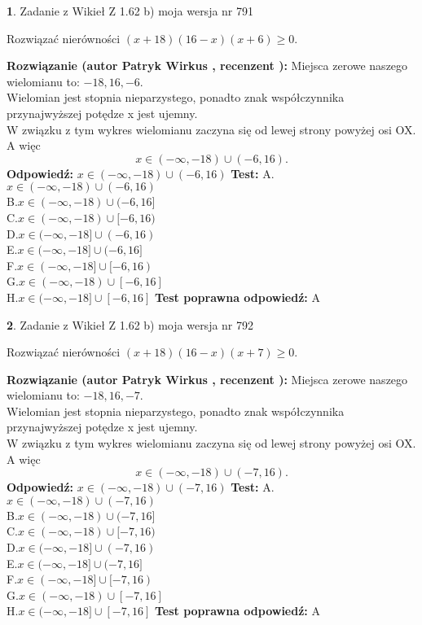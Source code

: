 \documentclass[12pt, a4paper]{article}
\theoremstyle{definition} %
\newtheorem{zad}{}
\newcommand{\zadStart}[1]{\begin{zad}#1\newline}
\newcommand{\zadStop}{\end{zad}}
\newcommand{\rozwStart}[2]{\noindent \textbf{Rozwiązanie (autor #1 , recenzent #2): }\newline}
\newcommand{\rozwStop}{\newline}
\newcommand{\odpStart}{\noindent \textbf{Odpowiedź:}\newline}
\newcommand{\odpStop}{\newline}
\newcommand{\testStart}{\noindent \textbf{Test:}\newline}
\newcommand{\testStop}{\newline}
\newcommand{\kluczStart}{\noindent \textbf{Test poprawna odpowiedź:}\newline}
\newcommand{\kluczStop}{\newline}
\begin{document}
\zadStart{Zadanie z Wikieł Z 1.62 b) moja wersja nr 791}

Rozwiązać nierówności $(x+18)(16-x)(x+6)\ge0$.
\zadStop
\rozwStart{Patryk Wirkus}{}
Miejsca zerowe naszego wielomianu to: $-18, 16, -6$.\\
Wielomian jest stopnia nieparzystego, ponadto znak współczynnika przy\linebreak najwyższej potędze x jest ujemny.\\ W związku z tym wykres wielomianu zaczyna się od lewej strony powyżej osi OX. A więc $$x \in (-\infty,-18) \cup (-6,16).$$
\rozwStop
\odpStart
$x \in (-\infty,-18) \cup (-6,16)$
\odpStop
\testStart
A.$x \in (-\infty,-18) \cup (-6,16)$\\
B.$x \in (-\infty,-18) \cup (-6,16]$\\
C.$x \in (-\infty,-18) \cup [-6,16)$\\
D.$x \in (-\infty,-18] \cup (-6,16)$\\
E.$x \in (-\infty,-18] \cup (-6,16]$\\
F.$x \in (-\infty,-18] \cup [-6,16)$\\
G.$x \in (-\infty,-18) \cup [-6,16]$\\
H.$x \in (-\infty,-18] \cup [-6,16]$
\testStop
\kluczStart
A
\kluczStop



\zadStart{Zadanie z Wikieł Z 1.62 b) moja wersja nr 792}

Rozwiązać nierówności $(x+18)(16-x)(x+7)\ge0$.
\zadStop
\rozwStart{Patryk Wirkus}{}
Miejsca zerowe naszego wielomianu to: $-18, 16, -7$.\\
Wielomian jest stopnia nieparzystego, ponadto znak współczynnika przy\linebreak najwyższej potędze x jest ujemny.\\ W związku z tym wykres wielomianu zaczyna się od lewej strony powyżej osi OX. A więc $$x \in (-\infty,-18) \cup (-7,16).$$
\rozwStop
\odpStart
$x \in (-\infty,-18) \cup (-7,16)$
\odpStop
\testStart
A.$x \in (-\infty,-18) \cup (-7,16)$\\
B.$x \in (-\infty,-18) \cup (-7,16]$\\
C.$x \in (-\infty,-18) \cup [-7,16)$\\
D.$x \in (-\infty,-18] \cup (-7,16)$\\
E.$x \in (-\infty,-18] \cup (-7,16]$\\
F.$x \in (-\infty,-18] \cup [-7,16)$\\
G.$x \in (-\infty,-18) \cup [-7,16]$\\
H.$x \in (-\infty,-18] \cup [-7,16]$
\testStop
\kluczStart
A
\kluczStop
\end{document}
